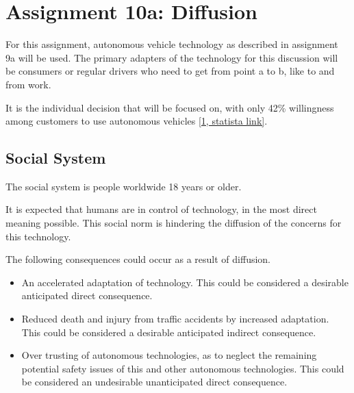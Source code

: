 \section*{Assignment 10a: Diffusion}
For this assignment, autonomous vehicle technology as described in assignment 9a will be used. 
The primary adapters of the technology for this discussion will be consumers or regular drivers who need to get from point a to b, like to and from work.

It is the individual decision that will be focused on, with only 42\% willingness among customers to use autonomous vehicles \href{https://www.statista.com/statistics/1231184/willingness-among-customers-worldwide-use-autonomous-vehicles-by-means-of-transport/}{[1, statista link]}.

\subsection*{Social System}
The social system is people worldwide 18 years or older.

It is expected that humans are in control of technology, in the most direct meaning possible. 
This social norm is hindering the diffusion of the concerns for this technology. 

The following consequences could occur as a result of diffusion.
\begin{itemize}
    \item An accelerated adaptation of technology. This could be considered a desirable anticipated direct consequence. 
    \item Reduced death and injury from traffic accidents by increased adaptation. This could be considered a desirable anticipated indirect consequence.
    \item Over trusting of autonomous technologies, as to neglect the remaining potential safety issues of this and other autonomous technologies. This could be considered an undesirable unanticipated direct consequence.
\end{itemize}

